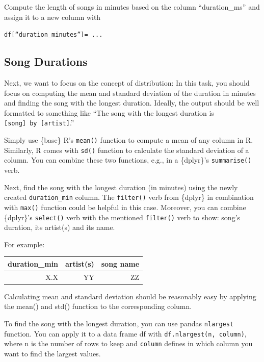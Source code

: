 \documentclass[
  11pt,
]{book}
\newenvironment{tips}[1]
  {
  \begin{itemize}
  \footnotesize
  \renewcommand{\labelitemi}{
    \raisebox{-.7\height}[0pt][0pt]{
      {\setkeys{Gin}{width=3em,keepaspectratio}
        \texttt{[image: images/\#1.png]}}
    }
  }
  \setlength{\fboxsep}{1em}
  \begin{rbox}
  \item
  }
  {
  \end{rbox}
  \end{itemize}
  }
\newenvironment{tipsp}[1]
  {
  \begin{itemize}
  \footnotesize
  \renewcommand{\labelitemi}{
    \raisebox{-.7\height}[0pt][0pt]{
      {\setkeys{Gin}{width=3em,keepaspectratio}
        \texttt{[image: images/\#1.png]}}
    }
  }
  \setlength{\fboxsep}{1em}
  \begin{pbox}
  \item
  }
  {
  \end{pbox}
  \end{itemize}
  }
\begin{document}
\begin{tipsp}p

Compute the length of songs in minutes based on the column ``duration\_ms'' and assign it to a new column with

\texttt{df{[}“duration\_minutes”{]}=\ ...}

\end{tipsp}

\hypertarget{song-durations}{%
\subsection{Song Durations}\label{song-durations}}

Next, we want to focus on the concept of distribution:
In this task, you should focus on computing the mean and standard deviation of the duration in minutes and finding the song with the longest duration.
Ideally, the output should be well formatted to something like ``The song with the longest duration is \texttt{{[}song{]}\ by\ {[}artist{]}}.''

\begin{tips}r

Simply use \{base\} R's \texttt{mean()} function to compute a mean of any column in R. Similarly, R comes with \texttt{sd()} function to calculate the standard deviation of a column. You can combine these two functions, e.g., in a \{dplyr\}'s \texttt{summarise()} verb.

Next, find the song with the longest duration (in minutes) using the newly created \texttt{duration\_min} column. The \texttt{filter()} verb from \{dplyr\} in combination with \texttt{max()} function could be helpful in this case. Moreover, you can combine \{dplyr\}'s \texttt{select()} verb with the mentioned \texttt{filter()} verb to show: song's duration, its artist(s) and its name.

For example:

\begin{longtable}[]{@{}rrr@{}}
\toprule
duration\_min & artist(s) & song name \\
\midrule
\endhead
X.X & YY & ZZ \\
\bottomrule
\end{longtable}

\end{tips}

\begin{tipsp}p

Calculating mean and standard deviation should be reasonably easy by applying the mean() and std() function to the corresponding column.

To find the song with the longest duration, you can use pandas \texttt{nlargest} function. You can apply it to a data frame df with \texttt{df.nlargest(n,\ column)}, where n is the number of rows to keep and \texttt{column} defines in which column you want to find the largest values.

\end{tipsp}
\end{document}
